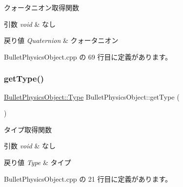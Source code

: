 クォータニオン取得関数 


\begin{DoxyParams}{引数}
{\em void} & なし \\
\hline
\end{DoxyParams}

\begin{DoxyRetVals}{戻り値}
{\em Quaternion} & クォータニオン \\
\hline
\end{DoxyRetVals}


 Bullet\+Physics\+Object.\+cpp の 69 行目に定義があります。

\mbox{\label{class_bullet_physics_object_a12027754be0d44356ab98617b7579a52}} 
\subsubsection{\texorpdfstring{get\+Type()}{getType()}}
{\footnotesize\ttfamily \mbox{\hyperlink{class_bullet_physics_object_ac428a5598df5fd4a450197e021420927}{Bullet\+Physics\+Object\+::\+Type}} Bullet\+Physics\+Object\+::get\+Type (\begin{DoxyParamCaption}{ }\end{DoxyParamCaption})}



タイプ取得関数 


\begin{DoxyParams}{引数}
{\em void} & なし \\
\hline
\end{DoxyParams}

\begin{DoxyRetVals}{戻り値}
{\em Type} & タイプ \\
\hline
\end{DoxyRetVals}


 Bullet\+Physics\+Object.\+cpp の 21 行目に定義があります。

\mbox{\label{class_bullet_physics_object_a6dc79cf0ac34446de037eac7b910d30b}} 
